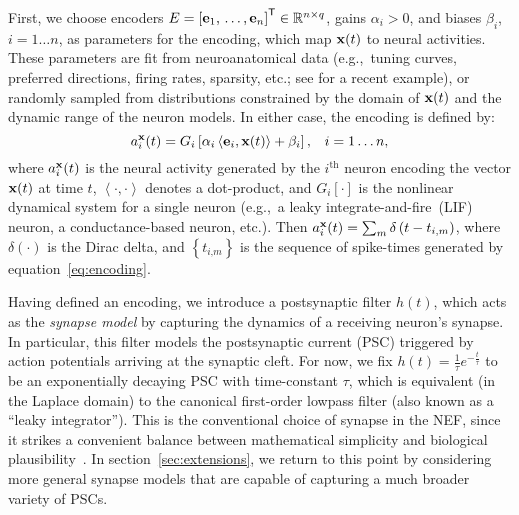 First, we choose encoders $E = {\left[ \mathbf{e}_1\text{,}\, \ldots\text{,}\, \mathbf{e}_n \right]}^\mathsf{T} \in \mathbb{R}^{n \times q}$, gains $\alpha_i > 0$, and biases $\beta_i$, $i = 1 \ldots n$, as parameters for the encoding, which map $\mathbf{x}(t)$ to neural activities.
These parameters are fit from neuroanatomical data (e.g.,~tuning curves, preferred directions, firing rates, sparsity, etc.; see \citet{voelker2016a} for a recent example), or randomly sampled from distributions constrained by the domain of $\mathbf{x}(t)$ and the dynamic range of the neuron models.
In either case, the encoding is defined by:
\begin{equation} \label{eq:encoding}
a_i^{\mathbf{x}}(t) = G_i \left[ \alpha_i \left\langle \mathbf{e}_i, \mathbf{x}(t) \right\rangle + \beta_i \right] \text{,} \quad i = 1 \ldots n \text{,}
\end{equation}
where $a_i^{\mathbf{x}}(t)$ is the neural activity generated by the $i^{\text{th}}$ neuron encoding the vector $\mathbf{x}(t)$ at time $t$, $\left\langle \cdot , \cdot \right\rangle$ denotes a dot-product, and $G_i[\cdot]$ is the nonlinear dynamical system for a single neuron (e.g.,~a leaky integrate-and-fire~(LIF) neuron, a conductance-based neuron, etc.).
Then $a_i^{\mathbf{x}}(t) = \sum_m \delta \left(t - t_{i\text{,}m} \right)$, where $\delta(\cdot)$ is the Dirac delta, and $\left\{ t_{i\text{,}m} \right\}$ is the sequence of spike-times generated by equation~\ref{eq:encoding}. %

Having defined an encoding, we introduce a postsynaptic filter $h(t)$, which acts as the \emph{synapse model} by capturing the dynamics of a receiving neuron's synapse.
In particular, this filter models the postsynaptic current (PSC) triggered by action potentials arriving at the synaptic cleft.
For now, we fix $h(t) = \frac{1}{\tau} e^{-\frac{t}{\tau}}$ to be an exponentially decaying PSC with time-constant $\tau$, which is equivalent (in the Laplace domain) to the canonical first-order lowpass filter (also known as a ``leaky integrator'').
This is the conventional choice of synapse in the NEF, since it strikes a convenient balance between mathematical simplicity and biological plausibility~\citep{eliasmith2003neural}.
In section~\ref{sec:extensions}, we return to this point by considering more general synapse models that are capable of capturing a much broader variety of PSCs.

